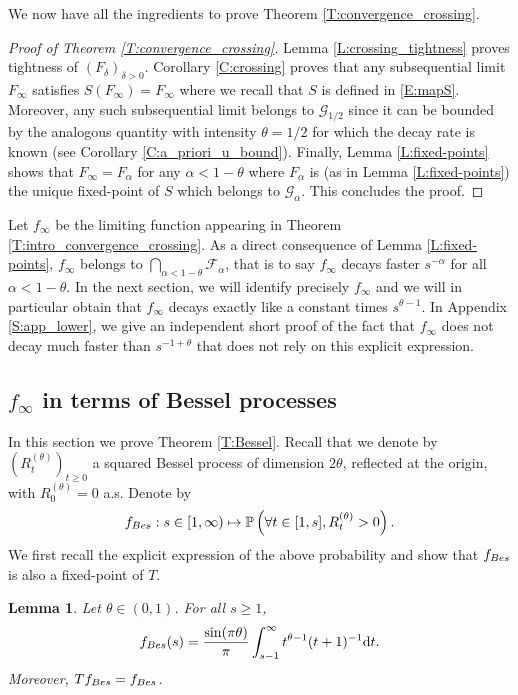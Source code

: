 \documentclass[11pt]{article}
\newtheorem{lemma}[theorem]{Lemma}
\theoremstyle{remark}
\newcommand{\Fc}{\mathcal{F}}
\newcommand{\Gc}{\mathcal{G}}
\newcommand{\Prob}[1]{\mathbb{P} \left( #1 \right) }
\renewcommand{\d}{\mathrm{d}}
\numberwithin{equation}{section}
\begin{document}
We now have all the ingredients to prove Theorem \ref{T:convergence_crossing}.

\begin{proof}[Proof of Theorem \ref{T:convergence_crossing}]
Lemma \ref{L:crossing_tightness} proves tightness of $(F_\delta)_{\delta >0}$. Corollary \ref{C:crossing} proves that any subsequential limit $F_\infty$ satisfies $S(F_\infty) = F_\infty$ where we recall that $S$ is defined in \eqref{E:mapS}. Moreover, any such subsequential limit belongs to $\Gc_{1/2}$ since it can be bounded by the analogous quantity with intensity $\theta = 1/2$ for which the decay rate is known (see Corollary \ref{C:a_priori_u_bound}). Finally, Lemma \ref{L:fixed-points} shows that $F_\infty = F_\alpha$ for any $\alpha < 1-\theta$ where $F_\alpha$ is (as in Lemma \ref{L:fixed-points}) the unique fixed-point of $S$ which belongs to $\Gc_\alpha$. This concludes the proof.
\end{proof}

Let $f_\infty$ be the limiting function appearing in Theorem \ref{T:intro_convergence_crossing}.
As a direct consequence of Lemma \ref{L:fixed-points}, $f_\infty$ belongs to $\bigcap_{\alpha < 1-\theta} \Fc_\alpha$, that is to say $f_\infty$ decays faster $s^{-\alpha}$ for all $\alpha < 1-\theta$. In the next section, we will identify precisely $f_\infty$ and we will in particular obtain that $f_\infty$ decays exactly like a constant times $s^{\theta-1}$. In Appendix \ref{S:app_lower}, we give an independent short proof of the fact that $f_\infty$ does not decay much faster than $s^{-1+\theta}$ that does not rely on this explicit expression.


\subsection{\texorpdfstring{$f_\infty$ in terms of Bessel processes}{f infinity in terms of Bessel processes}}\label{S:Bessel}

In this section we prove Theorem \ref{T:Bessel}. Recall that we denote by $(R_t^{(\theta)})_{t \geq 0}$ a squared Bessel process of dimension $2\theta$, reflected at the origin, with $R_0^{(\theta)} = 0$ a.s. Denote by
\[
f_{\rm Bes} : s \in [1,\infty) \mapsto \Prob{ \forall t \in [1,s], R_t^{(\theta)} >0 }.
\]
We first recall the explicit expression of the above probability and  show that $f_{\rm Bes}$ is also a fixed-point of $T$.

\begin{lemma}\label{L:Bessel_explicit}
Let $\theta \in (0,1)$.
For all $s \geq 1$,
\begin{equation}
\label{E:L_Bessel_explicit}
f_{\rm Bes}(s)
= \frac{\sin(\pi \theta)}{\pi} \int_{s-1}^\infty t^{\theta-1} (t+1)^{-1} \d t.
\end{equation}
Moreover, $T f_{\rm Bes} = f_{\rm Bes}$.
\end{lemma}
\end{document}
